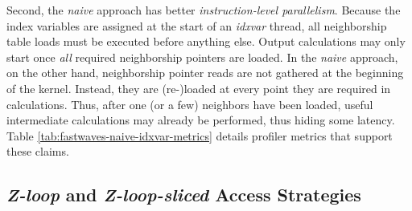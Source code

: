 Second, the \emph{naive} approach has better \emph{instruction-level parallelism}. Because the index variables are assigned at the start of an \emph{idxvar} thread, all neighborship table loads must be executed before anything else. Output calculations may only start once \emph{all} required neighborship pointers are loaded. In the \emph{naive} approach, on the other hand, neighborship pointer reads are not gathered at the beginning of the kernel. Instead, they are (re-)loaded at every point they are required in calculations. Thus, after one (or a few) neighbors have been loaded, useful intermediate calculations may already be performed, thus hiding some latency. Table \ref{tab:fastwaves-naive-idxvar-metrics} details profiler metrics that support these claims.



\subsection{\emph{Z-loop} and \emph{Z-loop-sliced} Access Strategies}

